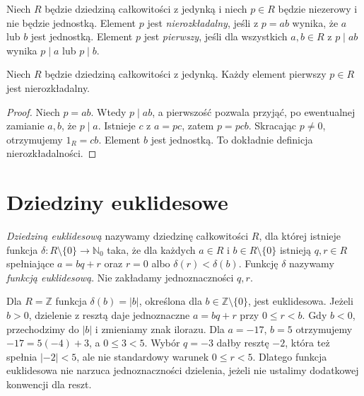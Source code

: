 \begin{definicja}
\label{aa:def:irreducible-prime}
Niech $R$ będzie dziedziną całkowitości z jedynką i niech
$p\in R$ będzie niezerowy i nie będzie jednostką.
Element $p$ jest \emph{nierozkładalny}, jeśli z $p=ab$
wynika, że $a$ lub $b$ jest jednostką.
Element $p$ jest \emph{pierwszy}, jeśli dla wszystkich
$a,b\in R$ z $p\mid ab$ wynika $p\mid a$ lub $p\mid b$.
\end{definicja}
\begin{lemat}
\label{aa:lem:prime-irred}
Niech $R$ będzie dziedziną całkowitości z jedynką.
Każdy element pierwszy $p\in R$ jest nierozkładalny.
\end{lemat}
\begin{proof}
Niech $p=ab$. Wtedy $p\mid ab$, a pierwszość
pozwala przyjąć, po ewentualnej zamianie $a,b$, że $p\mid a$.
Istnieje $c$ z $a=pc$, zatem $p=pcb$.
Skracając $p\ne0$, otrzymujemy $1_R=cb$.
Element $b$ jest jednostką. To dokładnie definicja nierozkładalności.
\end{proof}

\section{Dziedziny euklidesowe}
\begin{definicja}
\label{aa:def:euclidean-domain}
\emph{Dziedziną euklidesową} nazywamy dziedzinę całkowitości
$R$, dla której istnieje funkcja
$\delta:R\setminus\{0\}\to\mathbb N_0$ taka, że dla
każdych $a\in R$ i $b\in R\setminus\{0\}$ istnieją
$q,r\in R$ spełniające $a=bq+r$ oraz
$r=0$ albo $\delta(r)<\delta(b)$.
Funkcję $\delta$ nazywamy \emph{funkcją euklidesową}.
Nie zakładamy jednoznaczności $q,r$.
\end{definicja}

\begin{przyklad}
\label{aa:prz:integer-division}
Dla $R=\mathbb Z$ funkcja $\delta(b)=|b|$, określona dla
$b\in\mathbb Z\setminus\{0\}$, jest euklidesowa.
Jeżeli $b>0$, dzielenie z resztą daje jednoznaczne
$a=bq+r$ przy $0\le r<b$.
Gdy $b<0$, przechodzimy do $|b|$ i zmieniamy znak ilorazu.
Dla $a=-17$, $b=5$ otrzymujemy
$-17=5(-4)+3$, a $0\le3<5$. Wybór $q=-3$ dałby resztę
$-2$, która też spełnia $|{-2}|<5$, ale nie standardowy
warunek $0\le r<5$. Dlatego funkcja euklidesowa nie narzuca
jednoznaczności dzielenia, jeżeli nie ustalimy dodatkowej
konwencji dla reszt.
\end{przyklad}

